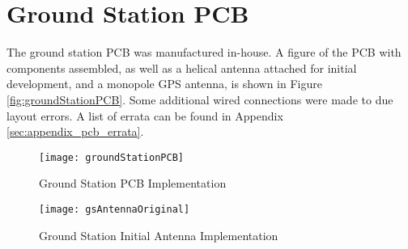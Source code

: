 \graphicspath{{./figures}}

\section{Ground Station PCB}

The ground station PCB was manufactured in-house. A figure of the PCB with components assembled, as well as a helical antenna attached for initial development, and a monopole GPS antenna, is shown in Figure \ref{fig:groundStationPCB}. Some additional wired connections were made to due layout errors. A list of errata can be found in Appendix \ref{sec:appendix_pcb_errata}.

\begin{figure}[!htb]
  \begin{minipage}{.49\textwidth}
    \centering
    \texttt{[image: groundStationPCB]}
    \caption{Ground Station PCB Implementation}
    \label{fig:groundStationPCB}
  \end{minipage}
  \begin{minipage}{.49\textwidth}
    \centering
    \texttt{[image: gsAntennaOriginal]}
    \caption{Ground Station Initial Antenna Implementation}
    \label{fig:gsAntennaOriginal}
  \end{minipage}
\end{figure}
